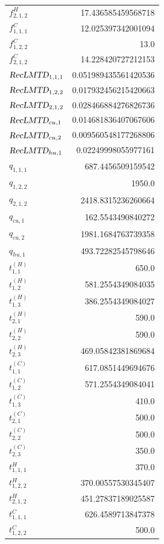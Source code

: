 \documentclass{article}%
\begin{document}
\begin{multicols*}{3}
\begin{supertabular}{lr}
	$f_{2,1,2}^{H}$ & 17.436585459568718 \\%
	$f_{1,1,1}^{C}$ & 12.025397342001094 \\%
	$f_{1,2,2}^{C}$ & 13.0 \\%
	$f_{2,1,2}^{C}$ & 14.228420727212153 \\%
	$\textsl{RecLMTD}_{1,1,1}$ & 0.051989435561420536 \\%
	$\textsl{RecLMTD}_{1,2,2}$ & 0.017932456215420663 \\%
	$\textsl{RecLMTD}_{2,1,2}$ & 0.028466884276826736 \\%
	$\textsl{RecLMTD}_{cu,1}$ & 0.014681836407067606 \\%
	$\textsl{RecLMTD}_{cu,2}$ & 0.009560548177268806 \\%
	$\textsl{RecLMTD}_{hu,1}$ & 0.02249998055977161 \\%
	$q_{1,1,1}$ & 687.4456509159542 \\%
	$q_{1,2,2}$ & 1950.0 \\%
	$q_{2,1,2}$ & 2418.8315236260664 \\%
	$q_{cu,1}$ & 162.5543490840272 \\%
	$q_{cu,2}$ & 1981.1684763739358 \\%
	$q_{hu,1}$ & 493.72282545798646 \\%
	$t_{1,1}^{(H)}$ & 650.0 \\%
	$t_{1,2}^{(H)}$ & 581.2554349084035 \\%
	$t_{1,3}^{(H)}$ & 386.2554349084027 \\%
	$t_{2,1}^{(H)}$ & 590.0 \\%
	$t_{2,2}^{(H)}$ & 590.0 \\%
	$t_{2,3}^{(H)}$ & 469.05842381869684 \\%
	$t_{1,1}^{(C)}$ & 617.0851449694676 \\%
	$t_{1,2}^{(C)}$ & 571.2554349084041 \\%
	$t_{1,3}^{(C)}$ & 410.0 \\%
	$t_{2,1}^{(C)}$ & 500.0 \\%
	$t_{2,2}^{(C)}$ & 500.0 \\%
	$t_{2,3}^{(C)}$ & 350.0 \\%
	$t_{1,1,1}^{H}$ & 370.0 \\%
	$t_{1,2,2}^{H}$ & 370.00557530345407 \\%
	$t_{2,1,2}^{H}$ & 451.27837189025587 \\%
	$t_{1,1,1}^{C}$ & 626.4589713847378 \\%
	$t_{1,2,2}^{C}$ & 500.0 \\%

\end{supertabular}
\end{multicols*}
\end{document}
